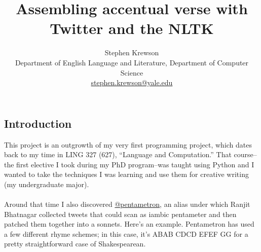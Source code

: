 \documentclass[a0,final]{a0poster}
\title{Assembling accentual verse with Twitter and the NLTK}
\author{
Stephen Krewson\\
Department of English Language and Literature, Department of Computer Science\\
\url{stephen.krewson@yale.edu}
}
\begin{document}
\hspace{-3cm}								%
\colorbox{boxcol}{							%
\begin{minipage}{1189mm}					%
\maketitle
\end{minipage}}
\vspace{1cm}

\begin{multicols}{3}							%
\raggedcolumns							%

\section*{Introduction}
This project is an outgrowth of my very first programming project, which dates back to my time in LING 327 (627), ``Language and Computation.'' That course--the first elective I took during my PhD program--was taught using Python and I wanted to take the techniques I was learning and use them for creative writing (my undergraduate major).\\
\\
Around that time I also discovered \url{@pentametron}, an alias under which Ranjit Bhatnagar collected tweets that could scan as iambic pentameter and then patched them together into a sonnets. Here's an example. Pentametron has used a few different rhyme schemes; in this case, it's ABAB CDCD EFEF GG for a pretty straightforward case of Shakespearean.\\


\end{multicols}
\end{document}
